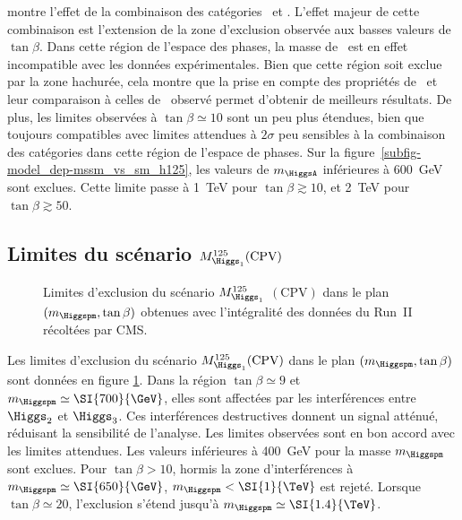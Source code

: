 montre l'effet de la combinaison des catégories \CATbsm\ et \CATsm.
L'effet majeur de cette combinaison est l'extension de la zone d'exclusion observée aux basses valeurs de $\tan\beta$.
Dans cette région de l'espace des phases, la masse de \higgsMSSM\ est en effet incompatible avec les données expérimentales.
Bien que cette région soit exclue par la zone hachurée,
cela montre que la prise en compte des propriétés de \higgsMSSM\
et leur comparaison à celles de \higgs\ observé permet d'obtenir de meilleurs résultats.
De plus, les limites observées à $\tan\beta\simeq\num{10}$ sont un peu plus étendues,
bien que toujours compatibles avec limites attendues à $2\sigma$
peu sensibles à la combinaison des catégories dans cette région de l'espace de phases.
Sur la figure~\ref{subfig-model_dep-mssm_vs_sm_h125},
les valeurs de $m_{\HiggsA}$ inférieures à \SI{600}{\GeV} sont exclues.
Cette limite passe à \SI{1}{\TeV} pour $\tan\beta\gtrsim\num{10}$,
et \SI{2}{\TeV} pour $\tan\beta\gtrsim\num{50}$.
\subsection[Limites du scénario $M_{\Higgs_1}^{125}$ avec violation de $CP$]{Limites du scénario $M_{\Higgs_1}^{125}(\text{CPV})$}
\begin{wrapfigure}[16]{R}{.475\textwidth}
\vspace{-3\baselineskip}
\centering
{}
\caption[Limites d'exclusion du scénario $M_{\Higgs_1}^{125}(\text{CPV})$.]{Limites d'exclusion du scénario $M_{\Higgs_1}^{125}$ $(\text{CPV})$ dans le plan $(m_{\Higgspm},\tan\beta)$ obtenues avec l'intégralité des données du Run~II récoltées par CMS.}
\label{fig-model_dep-CPV}
\end{wrapfigure}
Les limites d'exclusion du scénario $M_{\Higgs_1}^{125}(\text{CPV})$ dans le plan $(m_{\Higgspm},\tan\beta)$
sont données en figure \ref{fig-model_dep-CPV}.
Dans la région $\tan\beta\simeq\num{9}$ et $m_{\Higgspm}\simeq\SI{700}{\GeV}$,
elles sont affectées par les interférences entre $\Higgs_2$ et $\Higgs_3$.
Ces interférences destructives donnent un signal atténué, réduisant la sensibilité de l'analyse.
Les limites observées sont en bon accord avec les limites attendues.
Les valeurs inférieures à \SI{400}{\GeV} pour la masse $m_{\Higgspm}$ sont exclues.
Pour $\tan\beta>\num{10}$,
hormis la zone d'interférences à $m_{\Higgspm} \simeq \SI{650}{\GeV}$,
$m_{\Higgspm} < \SI{1}{\TeV}$ est rejeté.
Lorsque
$\tan\beta\simeq\num{20}$,
l'exclusion s'étend jusqu'à
$m_{\Higgspm} \simeq \SI{1.4}{\TeV}$.

